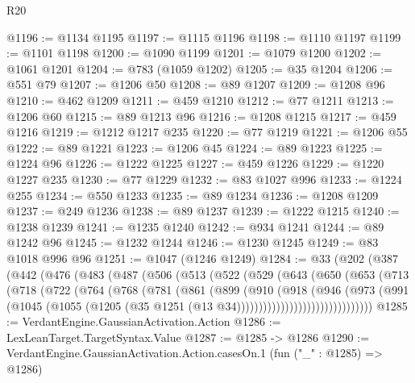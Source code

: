 \begin{lexlean}{R20}
\begin{coremodule}
@1196 := @1134 @1195
@1197 := @1115 @1196
@1198 := @1110 @1197
@1199 := @1101 @1198
@1200 := @1090 @1199
@1201 := @1079 @1200
@1202 := @1061 @1201
@1204 := @783 (@1059 @1202)
@1205 := @35 @1204
@1206 := @551 @79
@1207 := @1206 @50
@1208 := @89 @1207
@1209 := @1208 @96
@1210 := @462 @1209
@1211 := @459 @1210
@1212 := @77 @1211
@1213 := @1206 @60
@1215 := @89 @1213 @96
@1216 := @1208 @1215
@1217 := @459 @1216
@1219 := @1212 @1217 @235
@1220 := @77 @1219
@1221 := @1206 @55
@1222 := @89 @1221
@1223 := @1206 @45
@1224 := @89 @1223
@1225 := @1224 @96
@1226 := @1222 @1225
@1227 := @459 @1226
@1229 := @1220 @1227 @235
@1230 := @77 @1229
@1232 := @83 @1027 @996
@1233 := @1224 @255
@1234 := @550 @1233
@1235 := @89 @1234
@1236 := @1208 @1209
@1237 := @249 @1236
@1238 := @89 @1237
@1239 := @1222 @1215
@1240 := @1238 @1239
@1241 := @1235 @1240
@1242 := @934 @1241
@1244 := @89 @1242 @96
@1245 := @1232 @1244
@1246 := @1230 @1245
@1249 := @83 @1018 @996 @96
@1251 := @1047 (@1246 @1249)
@1284 := @33
    (@202
      (@387
        (@442
          (@476
            (@483
              (@487
                (@506
                  (@513
                    (@522
                      (@529
                        (@643
                          (@650
                            (@653
                              (@713
                                (@718
                                  (@722
                                    (@764
                                      (@768
                                        (@781
                                          (@861
                                            (@899
                                              (@910
                                                (@918
                                                  (@946
                                                    (@973
                                                      (@991
                                                        (@1045
                                                          (@1055
                                                            (@1205
                                                              (@35
                                                                @1251
                                                                (@13
                                                                  @34)))))))))))))))))))))))))))))))
@1285 := VerdantEngine.GaussianActivation.Action
@1286 := LexLeanTarget.TargetSyntax.Value
@1287 := @1285 -> @1286
@1290 := VerdantEngine.GaussianActivation.Action.casesOn.{1} (fun ("_" : @1285) => @1286)

\end{coremodule}
\end{lexlean}
